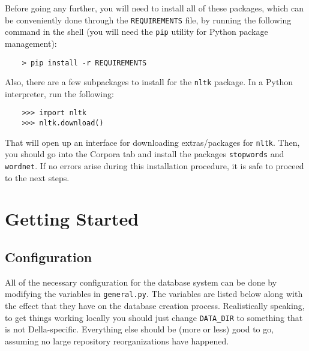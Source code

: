 \documentclass[11pt,letterpaper]{article}
\theoremstyle{plain}
\begin{document}
Before going any further, you will need to install all of these
packages, which can be conveniently done through the
\texttt{REQUIREMENTS} file, by running the following command in the
shell (you will need the \texttt{pip} utility for Python package
management):
\begin{verbatim}
    > pip install -r REQUIREMENTS
\end{verbatim}

Also, there are a few subpackages to install for the \texttt{nltk}
package.  In a Python interpreter, run the following:
\begin{verbatim}
    >>> import nltk
    >>> nltk.download()
\end{verbatim}
That will open up an interface for downloading extras/packages for
\texttt{nltk}. Then, you should go into the Corpora tab and install
the packages \texttt{stopwords} and \texttt{wordnet}.  If no errors
arise during this installation procedure, it is safe to proceed to the
next steps.

\section{Getting Started}

\subsection{Configuration}

All of the necessary configuration for the database system can be done by modifying the variables in \texttt{general.py}.
The variables are listed below along with the effect that they have on the database creation process.
Realistically speaking, to get things working locally you should just change \texttt{DATA\_DIR} to something that is not Della-specific.
Everything else should be (more or less) good to go, assuming no large repository reorganizations have happened.
\end{document}
